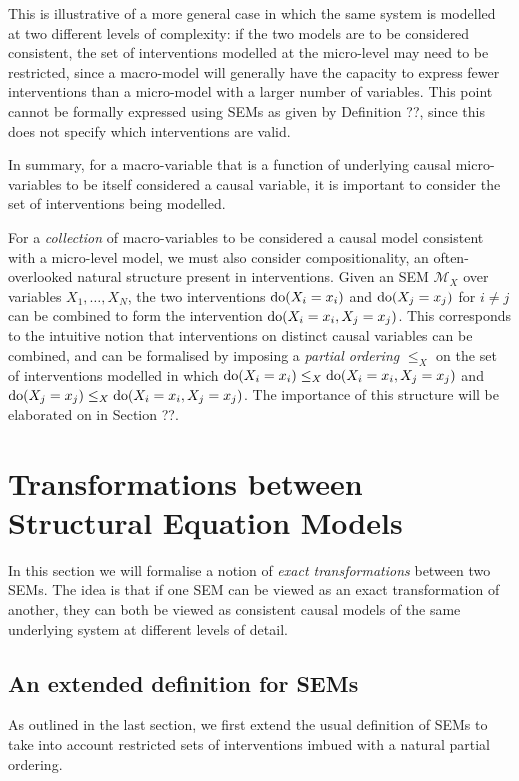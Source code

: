 This is illustrative of a more general case in which the same system is modelled at two different levels of complexity: if the two models are to be considered consistent, the set of interventions modelled at the micro-level may need to be restricted, since a macro-model will generally have the capacity to express fewer interventions than a micro-model with a larger number of variables. 
This point cannot be formally expressed using SEMs as given by Definition ??, since this does not specify which interventions are valid. 

In summary, for a macro-variable that is a function of underlying causal micro-variables to be itself considered a causal variable, it is important to consider the set of interventions being modelled.

For a \emph{collection} of macro-variables to be considered a causal model consistent with a micro-level model, we must also consider compositionality, an often-overlooked natural structure present in interventions.
Given an SEM $\mathcal{M}_X$ over variables $X_1, \ldots, X_N$, the two interventions $\operatorname{do}(X_i=x_i)$ and $\operatorname{do}(X_j=x_j)$ for $i\not=j$  can be combined to form the intervention $\operatorname{do}(X_i=x_i, X_j=x_j)$. 
This corresponds to the intuitive notion that interventions on distinct causal variables can be combined, and can be formalised by imposing a \emph{partial ordering} $\leq_X$ on the set of interventions modelled in which $\operatorname{do}(X_i=x_i) \leq_X \operatorname{do}(X_i=x_i, X_j=x_j)$ and $\operatorname{do}(X_j=x_j) \leq_X \operatorname{do}(X_i=x_i, X_j=x_j)$. 
The importance of this structure will be elaborated on in Section ??.


\section{Transformations between Structural Equation Models}

In this section we will formalise a notion of \emph{exact transformations} between two SEMs. 
The idea is that if one SEM can be viewed as an exact transformation of another, they can both be viewed as consistent causal models of the same underlying system at different levels of detail. 


\subsection{An extended definition for SEMs}

As outlined in the last section, we first extend the usual definition of SEMs to take into account restricted sets of interventions imbued with a natural partial ordering.

